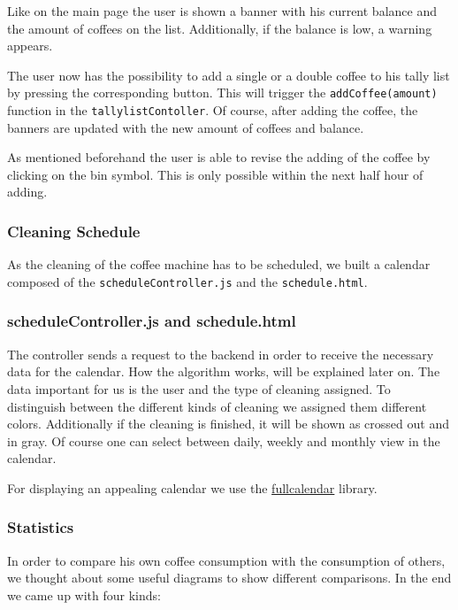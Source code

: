 Like on the main page the user is shown a banner with his current
balance and the amount of coffees on the list. Additionally, if the
balance is low, a warning appears.

The user now has the possibility to add a single or a double coffee to
his tally list by pressing the corresponding button. This will trigger
the \texttt{addCoffee(amount)} function in the
\texttt{tallylistContoller}. Of course, after adding the coffee, the
banners are updated with the new amount of coffees and balance.

As mentioned beforehand the user is able to revise the adding of the
coffee by clicking on the bin symbol. This is only possible within the
next half hour of adding.

\subsubsection{Cleaning Schedule}\label{cleaning-schedule}

As the cleaning of the coffee machine has to be scheduled, we built a
calendar composed of the \texttt{scheduleController.js} and the
\texttt{schedule.html}.

\subsubsection*{scheduleController.js and schedule.html}

The controller sends a request to the backend in order to receive the
necessary data for the calendar. How the algorithm works, will be
explained later on. The data important for us is the user and the type
of cleaning assigned. To distinguish between the different kinds of
cleaning we assigned them different colors. Additionally if the cleaning
is finished, it will be shown as crossed out and in gray. Of course one
can select between daily, weekly and monthly view in the calendar.

For displaying an appealing calendar we use the
\href{http://fullcalendar.io/}{fullcalendar} library.

\subsubsection{Statistics}\label{statistics}

In order to compare his own coffee consumption with the consumption of
others, we thought about some useful diagrams to show different
comparisons. In the end we came up with four kinds:

